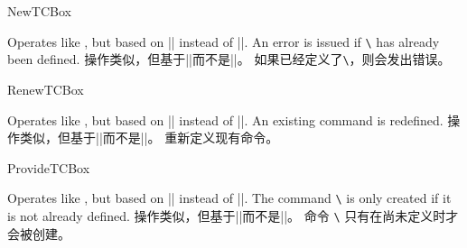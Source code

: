 \begin{docCommand}{NewTCBox}{}
\begin{stripedbox}
Operates like , but based on |\NewDocumentCommand| instead of |\DeclareDocumentCommand|.
An error is issued if \texttt{\textbackslash} has already been defined.
\tcblower
操作类似，但基于|\NewDocumentCommand|而不是|\DeclareDocumentCommand|。
如果已经定义了\texttt{\textbackslash}，则会发出错误。
\end{stripedbox}
\end{docCommand}

\begin{docCommand}{RenewTCBox}{}
\begin{stripedbox}
Operates like , but based on |\RenewDocumentCommand| instead of |\DeclareDocumentCommand|.
An existing command is redefined.
\tcblower
操作类似，但基于|\RenewDocumentCommand|而不是|\DeclareDocumentCommand|。%
重新定义现有命令。
\end{stripedbox}
\end{docCommand}

\begin{docCommand}{ProvideTCBox}{}
\begin{stripedbox}
Operates like , but based on |\ProvideDocumentCommand| instead of |\DeclareDocumentCommand|.
The command \texttt{\textbackslash} is only created if it is not already defined.
\tcblower
操作类似，但基于|\ProvideDocumentCommand|而不是|\DeclareDocumentCommand|。
命令 \texttt{\textbackslash} 只有在尚未定义时才会被创建。
\end{stripedbox}
\end{docCommand}


